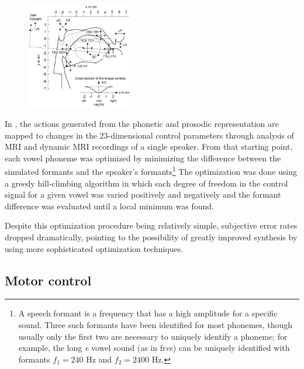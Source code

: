 \documentclass{article}
\begin{document}
\begin{figure}
  \vspace{-30pt}
  \begin{center}
    \includegraphics[width=0.41\textwidth]{birholz-params}
  \end{center}
  \vspace{-24pt}
\end{figure}

In \citet{birkholz2013}, the actions generated from
the phonetic and prosodic representation
are mapped to changes in
the 23-dimensional control parameters
through analysis of MRI and dynamic MRI recordings
of a single speaker.
From that starting point,
each vowel phoneme was optimized
by minimizing the difference
between the simulated formants
and the speaker's formants\footnote{A
speech formant is a frequency that
has a high amplitude for a specific sound.
Three such formants have been identified
for most phonemes, though usually only the first
two are necessary to uniquely identify
a phoneme; for example, the long \textit{e}
vowel sound (as in fr\textit{ee})
can be uniquely identified with
formants $f_1=240$ Hz and $f_2=2400$ Hz.}
The optimization
was done using a greedy hill-climbing algorithm
in which each degree of freedom in
the control signal for a given vowel
was varied positively and negatively
and the formant difference was evaluated
until a local minimum was found.

Despite this optimization procedure
being relatively simple,
subjective error rates dropped dramatically,
pointing to the possibility
of greatly improved synthesis
by using more sophisticated optimization techniques.

\subsection{Motor control}
\label{subsec:motor-control}
\end{document}
